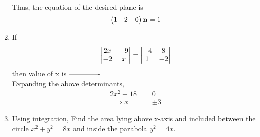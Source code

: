 \documentclass[journal,12pt,twocolumn]{IEEEtran}
\renewcommand\thesection{\arabic{section}}
\begin{document}
\begin{enumerate}[label=\thesection.\arabic*.,ref=\thesection.\theenumi]
\begin{align}
  \end{align}
  Thus, the equation of the desired plane is 
\begin{align}
\begin{pmatrix}1 & 2 & 0\end{pmatrix} \mathbf{n} = 1
  \end{align}
\item  If \begin{align} \begin{vmatrix}2x & -9 \\ -2 & x\end{vmatrix}  = \begin{vmatrix}-4 & 8 \\ 1 & -2 \end{vmatrix} \nonumber \end{align} then value of x is -------------\\
\solution
		Expanding the above determinants,
\begin{align}
	2x^2 - 18 &= 0
	\\
	\implies x &= \pm 3
\end{align}
 \item Using integration, Find the area lying above x-axis and included between the circle $ x^2 + y^2 =8x $ and inside the parabola $ y^2 =4x $.   
    

\end{enumerate}
\end{document}
